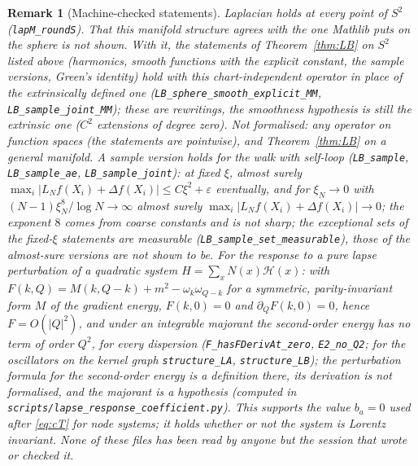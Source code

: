 \documentclass[11pt,a4paper]{article}
\theoremstyle{stmt}
\theoremstyle{defn}
\theoremstyle{rmk}
\newtheorem{remark}[theorem]{Remark}
\numberwithin{equation}{section}
\begin{document}
{\begin{remark}[Machine-checked statements]
Laplacian holds at every point of $S^2$ (\texttt{lapM\_roundS}). That this manifold structure agrees with the one Mathlib puts on the sphere is not shown. With it, the statements of Theorem~\ref{thm:LB} on $S^2$ listed above (harmonics, smooth functions with the explicit constant, the sample versions, Green's identity) hold with this chart-independent operator in place of the extrinsically defined one (\texttt{LB\_sphere\_smooth\_explicit\_MM}, \texttt{LB\_sample\_joint\_MM}); these are rewritings, the smoothness hypothesis is still the extrinsic one ($C^2$ extensions of degree zero). Not formalised: any operator on function spaces (the statements are pointwise), and Theorem~\ref{thm:LB} on a general manifold. A sample version holds for the walk with self-loop (\texttt{LB\_sample}, \texttt{LB\_sample\_ae}, \texttt{LB\_sample\_joint}): at fixed $\xi$, almost surely $\max_i|L_Nf(X_i)+\Delta f(X_i)|\le C\xi^2+\varepsilon$ eventually, and for $\xi_N\to0$ with $(N-1)\xi_N^8/\log N\to\infty$ almost surely $\max_i|L_Nf(X_i)+\Delta f(X_i)|\to0$; the exponent $8$ comes from coarse constants and is not sharp; the exceptional sets of the fixed-$\xi$ statements are measurable (\texttt{LB\_sample\_set\_measurable}), those of the almost-sure versions are not shown to be. For the response to a pure lapse perturbation of a quadratic system $H=\sum_xN(x)\mathcal H(x)$: with $F(k,Q)=M(k,Q-k)+m^2-\omega_k\omega_{Q-k}$ for a symmetric, parity-invariant form $M$ of the gradient energy, $F(k,0)=0$ and $\partial_QF(k,0)=0$, hence $F=O(|Q|^2)$, and under an integrable majorant the second-order energy has no term of order $Q^2$, for every dispersion (\texttt{F\_hasFDerivAt\_zero}, \texttt{E2\_no\_Q2}; for the oscillators on the kernel graph \texttt{structure\_LA}, \texttt{structure\_LB}); the perturbation formula for the second-order energy is a definition there, its derivation is not formalised, and the majorant is a hypothesis (computed in \texttt{scripts/lapse\_response\_coefficient.py}). This supports the value $b_a=0$ used after \eqref{eq:cT} for node systems; it holds whether or not the system is Lorentz invariant. None of these files has been read by anyone but the session that wrote or checked it.\par

\end{remark}}
\end{document}
